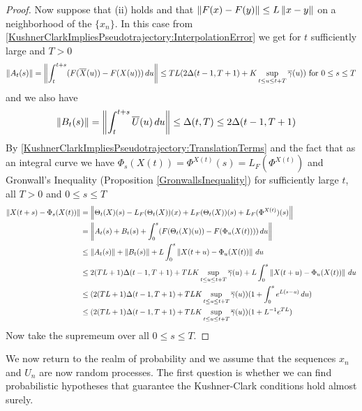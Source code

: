 \begin{proof}
Now suppose that (ii) holds and that $\left \lVert F(x) - F(y) \right \rVert \leq L \left \lVert x - y \right \rVert$ on a neighborhood of the $\lbrace x_n \rbrace$.  In this case from \eqref{KushnerClarkImpliesPseudotrajectory:InterpolationError} we get for $t$ sufficiently large and $T>0$
\begin{align*}
\left \lVert A_t(s) \right \rVert &= \left \lVert \int_t^{t+s} (F(\overline{X}(u)) - F(X(u))) \, du \right \rVert \leq T L (2\Delta(t-1, T+1) + K\sup_{t \leq u \leq t+T}\overline{\gamma}(u) ) \text{ for $0 \leq s \leq T$} \\
\end{align*}
and we also have
\begin{align*}
\left \lVert B_t(s) \right \rVert &= \left \lVert \int_t^{t+s} \overline{U}(u) \, du \right \rVert \leq \Delta(t,T) \leq 2 \Delta(t-1, T+1)
\end{align*}
By \eqref{KushnerClarkImpliesPseudotrajectory:TranslationTerms} and the fact that as an integral curve we have $\Phi_s(X(t)) = \Phi^{X(t)}(s)= L_F(\Phi^{X(t)})$ and Gronwall's Inequality (Proposition \ref{GronwallsInequality}) for sufficiently large $t$, all $T>0$ and $0 \leq s \leq T$
\begin{align*}
\left \lVert X(t+s) - \Phi_s(X(t)) \right \rVert &= \left \lVert \Theta_t(X)(s) - L_F(\Theta_t(X))(x) +  L_F(\Theta_t(X))(s) + L_F(\Phi^{X(t)})(s) \right \rVert \\
&=\left \lVert A_t(s) + B_t(s) +  \int_0^s (F(\Theta_t(X)(u)) - F(\Phi_u(X(t)))) \, du \right \rVert \\
&\leq \left \lVert A_t(s) \right \rVert + \left \lVert B_t(s) \right \rVert + L \int_0^s \left \lVert X(t+u) - \Phi_u(X(t)) \right \rVert \, du \\
&\leq 2(TL + 1) \Delta(t-1, T+1) + TLK \sup_{t \leq u \leq t+T}\overline{\gamma}(u) + L \int_0^s \left \lVert X(t+u) - \Phi_u(X(t)) \right \rVert \, du \\
&\leq (2(TL + 1) \Delta(t-1, T+1) + TLK \sup_{t \leq u \leq t+T}\overline{\gamma}(u)) (1 + \int_0^s e^{L(s-u)} \, du) \\
&\leq (2(TL + 1) \Delta(t-1, T+1) + TLK \sup_{t \leq u \leq t+T}\overline{\gamma}(u)) (1 + L^{-1} e^{TL}) \\
\end{align*}
Now take the supremeum over all $0 \leq s \leq T$.
\end{proof}

We now return to the realm of probability and we assume that the sequences $x_n$ and $U_n$ are now random processes.  The first question is whether we can find probabilistic hypotheses 
that guarantee the Kushner-Clark conditions hold almost surely.  

